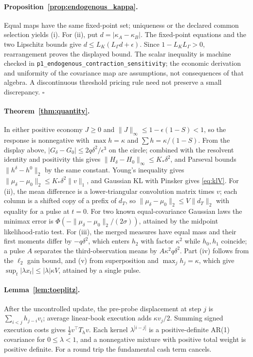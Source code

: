 \paragraph{Proposition~\ref{prop:endogenous_kappa}.} Equal maps have the same fixed-point set; uniqueness or the declared common selection yields (i). For (ii), put $d=|\kappa_A-\kappa_B|$. The fixed-point equations and the two Lipschitz bounds give $d\le L_K(L_\Gamma d+\epsilon)$. Since $1-L_KL_\Gamma>0$, rearrangement proves the displayed bound. The scalar inequality is machine checked in \nolinkurl{p1_endogenous_contraction_sensitivity}; the economic derivation and uniformity of the covariance map are assumptions, not consequences of that algebra. A discontinuous threshold pricing rule need not preserve a small discrepancy. $\square$

\paragraph{Theorem~\ref{thm:quantity}.} In either positive economy $J\ge0$ and $\|J\|_\infty\le1-\epsilon(1-S)<1$, so the response is nonnegative with $\max h=\kappa$ and $\sum h=\kappa/(1-S)$. From the display above, $|G_\delta-G_0|\le2q\delta^2/\epsilon^3$ on the circle; combined with the resolvent identity and positivity this gives $\|H_\delta-H_0\|_\infty\le K_*\delta^2$, and Parseval bounds $\|h^\delta-h^0\|_2$ by the same constant. Young's inequality gives $\|\mu_\delta-\mu_0\|_2\le K_*\delta^2\|v\|_1$, and Gaussian KL with Pinsker gives \eqref{eq:klV}. For (ii), the mean difference is a lower-triangular convolution matrix times $v$; each column is a shifted copy of a prefix of $d_T$, so $\|\mu_\delta-\mu_0\|_2\le V\|d_T\|_2$ with equality for a pulse at $t=0$. For two known equal-covariance Gaussian laws the minimax error is $\Phi(-\|\mu_\delta-\mu_0\|_2/(2\sigma))$, attained by the midpoint likelihood-ratio test. For (iii), the merged measures have equal mass and their first moments differ by $-q\delta^2$, which enters $h_2$ with factor $\kappa^2$ while $h_0,h_1$ coincide; a pulse $A$ separates the third-observation means by $A\kappa^2q\delta^2$. Part (iv) follows from the $\ell_2$ gain bound, and (v) from superposition and $\max_jh_j=\kappa$, which give $\sup_t|\lambda x_t|\le|\lambda|\kappa V$, attained by a single pulse.

\paragraph{Lemma~\ref{lem:toeplitz}.} After the uncontrolled update, the pre-probe displacement at step $j$ is $\sum_{i<j}h_{j-i}v_i$; average linear-book execution adds $\kappa v_j/2$. Summing signed execution costs gives $\tfrac12v^\top T_hv$. Each kernel $\lambda^{|i-j|}$ is a positive-definite AR(1) covariance for $0\le\lambda<1$, and a nonnegative mixture with positive total weight is positive definite. For a round trip the fundamental cash term cancels.

